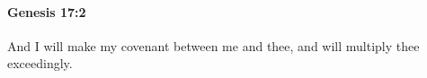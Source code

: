
		\paragraph{Genesis 17:2} %
			\label{GENESIS-17-2}

			And I will make my covenant between me and thee, and will multiply thee exceedingly.


